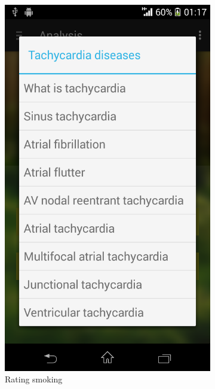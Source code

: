 \begin{figure}
\begin{subfigure}{.24\textwidth}
  \includegraphics[width=.8\linewidth]{img/screenshot/ss12.png}
  \caption{Rating smoking}
\end{subfigure}
\begin{subfigure}{.24\textwidth}
  \centering

\end{subfigure}
\end{figure}
